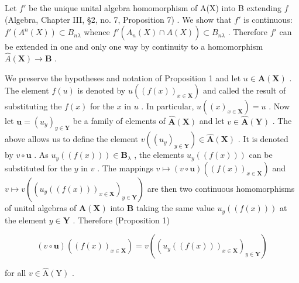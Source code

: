 Let \(f'\) be the unique unital algebra homomorphism of A(X) into B extending \(f\) (Algebra, Chapter III, \S 2, no. 7, Proposition 7) . We show that \(f'\) is continuous: \(f'(A^n(X)) \subset B_{n\lambda}\) whence \(f'(\hat{A}_n(X) \cap A(X)) \subset B_{n\lambda}\) . Therefore \(f'\) can be extended in one and only one way by continuity to a homomorphism \(\hat{A}(\mathbf{X}) \to \mathbf{B}\) .

We preserve the hypotheses and notation of Proposition 1 and let \(u \in \hat{\mathbf{A}}(\mathbf{X})\) . The element \(f(u)\) is denoted by \(u((f(x))_{x \in \mathbf{X}})\) and called the result of substituting the \(f(x)\) for the \(x\) in \(u\) . In particular, \(u((x)_{x \in \mathbf{X}}) = u\) . Now let \(\boldsymbol{u} = (u_y)_{y \in \mathbf{Y}}\) be a family of elements of \(\hat{\mathbf{A}}(\mathbf{X})\) and let \(v \in \hat{\mathbf{A}}(\mathbf{Y})\) . The above allows us to define the element \(v((u_y)_{y \in \mathbf{Y}}) \in \hat{\mathbf{A}}(\mathbf{X})\) . It is denoted by \(v \circ \boldsymbol{u}\) . As \(u_y((f(x))) \in \mathbf{B}_{\lambda}\) , the elements \(u_y((f(x)))\) can be substituted for the \(y\) in \(v\) . The mappings \(v \mapsto (v \circ \boldsymbol{u})((f(x))_{x \in \mathbf{X}})\) and \(v \mapsto v((u_y((f(x)))_{x \in \mathbf{X}})_{y \in \mathbf{Y}})\) are then two continuous homomorphisms of unital algebras of \(\hat{\mathbf{A}}(\mathbf{X})\) into \(\mathbf{B}\) taking the same value \(u_y((f(x)))\) at the element \(y \in \mathbf{Y}\) . Therefore (Proposition 1)

\[
(v \circ \boldsymbol {u}) ((f (x))_{x \in \mathbf{X}}) = v ((u _ {y} ((f (x)))_{x \in \mathbf{X}})_{y \in \mathbf{Y}})\tag{2}
\]

for all \(v \in \hat{\mathrm{A}}(\mathrm{Y})\) .

